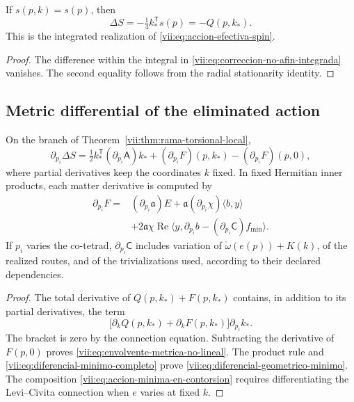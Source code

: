 \begin{corollary}
\label{vii:cor:recuperacion-eliminacion-afin}
If \(s(p,k)=s(p)\), then
\[
 \Delta S=-\tfrac14 k_*^{\mathsf T}s(p)=-Q(p,k_*).
\]
This is the integrated realization of
\eqref{vii:eq:accion-efectiva-spin}.
\end{corollary}
\begin{proof}
The difference within the integral in
\eqref{vii:eq:correccion-no-afin-integrada} vanishes. The second
equality follows from the radial stationarity identity.
\end{proof}

\subsection{Metric differential of the eliminated action}
\label{vii:subsec:diferencial-metrico-no-lineal}

\begin{theorem}
\label{vii:thm:envolvente-metrica}
On the branch of Theorem~\ref{vii:thm:rama-torsional-local},
\begin{equation}
 \partial_{p_i}\Delta S
 =\tfrac12 k_*^{\mathsf T}(\partial_{p_i}\mathsf A)k_*
  +(\partial_{p_i}F)(p,k_*)-(\partial_{p_i}F)(p,0),
 \label{vii:eq:envolvente-metrica-no-lineal}
\end{equation}
where partial derivatives keep the coordinates \(k\) fixed.
In fixed Hermitian inner products, each matter derivative is computed by
\begin{equation}
 \begin{split}
 \partial_{p_i}F={}&(\partial_{p_i}\mathfrak a)E
       +\mathfrak a(\partial_{p_i}\chi)\langle b,y\rangle\\
   &+2\mathfrak a\chi\operatorname{Re}
       \langle y,\partial_{p_i}b
                    -(\partial_{p_i}\mathsf C)f_{\min}\rangle.
 \end{split}
 \label{vii:eq:diferencial-geometrico-minimo}
\end{equation}
If \(p_i\) varies the co-tetrad, \(\partial_{p_i}\mathsf C\)
includes variation of
\(\mathring\omega(e(p))+K(k)\), of the realized routes, and
of the trivializations used, according to their declared dependencies.
\end{theorem}

\begin{proof}
The total derivative of \(Q(p,k_*)+F(p,k_*)\) contains, in
addition to its partial derivatives, the term
\[
 \bigl[\partial_kQ(p,k_*)+\partial_kF(p,k_*)\bigr]
                      \partial_{p_i}k_*.
\]
The bracket is zero by the connection equation. Subtracting the
derivative of \(F(p,0)\) proves
\eqref{vii:eq:envolvente-metrica-no-lineal}.
The product rule and
\eqref{vii:eq:diferencial-minimo-completo} prove
\eqref{vii:eq:diferencial-geometrico-minimo}. The composition
\eqref{vii:eq:accion-minima-en-contorsion} requires differentiating
the Levi--Civita connection when \(e\) varies at fixed \(k\).
\end{proof}

